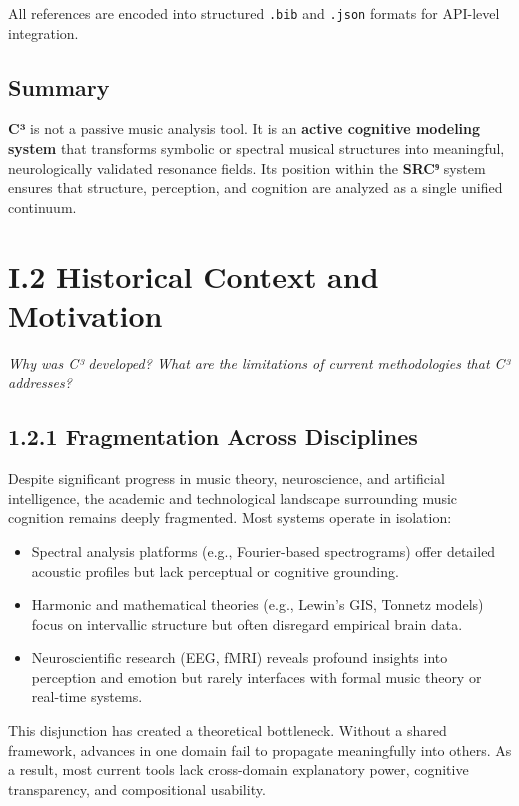 All references are encoded into structured \texttt{.bib} and \texttt{.json} formats for API-level integration.

\subsection*{Summary}

\textbf{C³} is not a passive music analysis tool. It is an \textbf{active cognitive modeling system} that transforms symbolic or spectral musical structures into meaningful, neurologically validated resonance fields. Its position within the \textbf{SRC⁹} system ensures that structure, perception, and cognition are analyzed as a single unified continuum.

\section*{I.2 Historical Context and Motivation}

\textit{Why was C³ developed? What are the limitations of current methodologies that C³ addresses?}

\subsection*{1.2.1 Fragmentation Across Disciplines}

Despite significant progress in music theory, neuroscience, and artificial intelligence, the academic and technological landscape surrounding music cognition remains deeply fragmented. Most systems operate in isolation:

\begin{itemize}
    \item Spectral analysis platforms (e.g., Fourier-based spectrograms) offer detailed acoustic profiles but lack perceptual or cognitive grounding.
    \item Harmonic and mathematical theories (e.g., Lewin’s GIS, Tonnetz models) focus on intervallic structure but often disregard empirical brain data.
    \item Neuroscientific research (EEG, fMRI) reveals profound insights into perception and emotion but rarely interfaces with formal music theory or real-time systems.
\end{itemize}

This disjunction has created a theoretical bottleneck. Without a shared framework, advances in one domain fail to propagate meaningfully into others. As a result, most current tools lack cross-domain explanatory power, cognitive transparency, and compositional usability.

